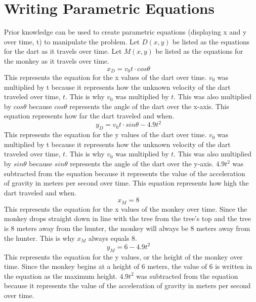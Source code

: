 \documentclass[12pt]{article}
\begin{document}
\section{Writing Parametric Equations}
Prior knowledge can be used to create parametric equations (displaying x and y over time, t) to manipulate the problem. Let $D(x,y)$ be listed as the equations for the dart as it travels over time. Let $M(x,y)$ be listed as the equations for the monkey as it travels over time.\\
$$x_D=v_{0}t\cdot cos\theta$$
This represents the equation for the x values of the dart over time. $v_0$ was multiplied by t because it represents how the unknown velocity of the dart traveled over time, $t$. This is why $v_0$ was multiplied by $t$. This was also multiplied by $cos\theta$ because $cos\theta$ represents the angle of the dart over the x-axis. This equation represents how far the dart traveled and when.
$$y_D=v_{0}t\cdot sin\theta-4.9t^2$$
This represents the equation for the y values of the dart over time. $v_0$ was multiplied by t because it represents how the unknown velocity of the dart traveled over time, $t$. This is why $v_0$ was multiplied by $t$. This was also multiplied by $sin\theta$ because $sin\theta$ represents the angle of the dart over the y-axis. $4.9t^2$ was subtracted from the equation because it represents the value of the acceleration of gravity in meters per second over time. This equation represents how high the dart traveled and when.
$$x_M=8$$
This represents the equation for the x values of the monkey over time. Since the monkey drops straight down in line with the tree from the tree's top and the tree is 8 meters away from the hunter, the monkey will always be 8 meters away from the hunter. This is why $x_M$ always equals 8.
$$y_M=6-4.9t^2$$
This represents the equation for the y values, or the height of the monkey over time. Since the monkey begins at a height of 6 meters, the value of 6 is written in the equation as the maximum height. $4.9t^2$ was subtracted from the equation because it represents the value of the acceleration of gravity in meters per second over time.
\end{document}
